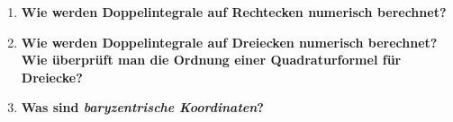\begin{enumerate}
		\item \textbf{Wie werden Doppelintegrale auf Rechtecken numerisch berechnet?} \\
		
		\item \textbf{Wie werden Doppelintegrale auf Dreiecken numerisch berechnet? Wie überprüft man die Ordnung einer Quadraturformel für Dreiecke?} \\
		
		\item \textbf{Was sind \textit{baryzentrische Koordinaten}?} \\
		
	\end{enumerate}